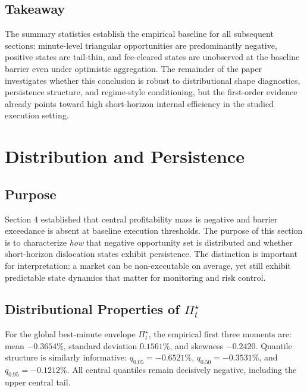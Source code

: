 \documentclass[11pt,a4paper]{article}
\begin{document}
\begin{table}[H]
\centering
\caption{Aggregated upper-bound profitability}
\end{table}

\subsection{Takeaway}
The summary statistics establish the empirical baseline for all subsequent sections: minute-level triangular opportunities are predominantly negative, positive states are tail-thin, and fee-cleared states are unobserved at the baseline barrier even under optimistic aggregation. The remainder of the paper investigates whether this conclusion is robust to distributional shape diagnostics, persistence structure, and regime-style conditioning, but the first-order evidence already points toward high short-horizon internal efficiency in the studied execution setting.

\section{Distribution and Persistence}
\subsection{Purpose}
Section 4 established that central profitability mass is negative and barrier exceedance is absent at baseline execution thresholds. The purpose of this section is to characterize \emph{how} that negative opportunity set is distributed and whether short-horizon dislocation states exhibit persistence. The distinction is important for interpretation: a market can be non-executable on average, yet still exhibit predictable state dynamics that matter for monitoring and risk control.

\subsection{Distributional Properties of $\Pi^\star_t$}
For the global best-minute envelope $\Pi^\star_t$, the empirical first three moments are: mean $-0.3654\%$, standard deviation $0.1561\%$, and skewness $-0.2420$. Quantile structure is similarly informative: $q_{0.05}=-0.6521\%$, $q_{0.50}=-0.3531\%$, and $q_{0.95}=-0.1212\%$. All central quantiles remain decisively negative, including the upper central tail.
\end{document}
